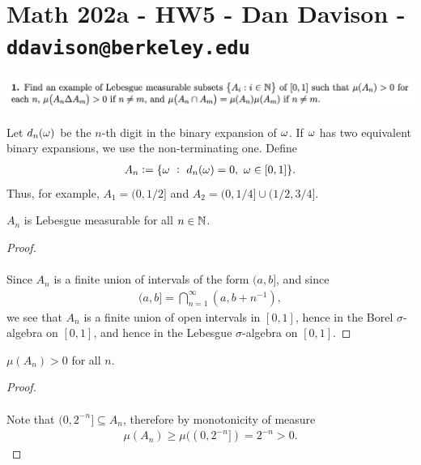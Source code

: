 \section*{Math 202a - HW5 - Dan Davison - \texttt{ddavison@berkeley.edu}}

\begin{mdframed}
\includegraphics[width=400pt]{img/analysis--berkeley-202a-hw05-781b.png}
\end{mdframed}


\begin{definition*}
  Let $d_n(\omega)$ be the $n$-th digit in the binary expansion of $\omega$. If $\omega$ has two equivalent binary
  expansions, we use the non-terminating one. Define
  \begin{align*}
    A_n := \{\omega ~:~ d_n(\omega) = 0, ~ \omega \in [0, 1]\}.
  \end{align*}
  Thus, for example, $A_1 = (0, 1/2]$ and $A_2 = (0, 1/4] \cup (1/2, 3/4]$.
\end{definition*}

\begin{claim*}
  $A_n$ is Lebesgue measurable for all $n \in \mathbb{N}$.
\end{claim*}

\begin{proof}~\\~\\
  Since $A_n$ is a finite union of intervals of the form $(a, b]$, and since
  \begin{align*}
    (a, b] = \bigcap_{n=1}^\infty (a, b + n^{-1}),
  \end{align*}
  we see that $A_n$ is a finite union of open intervals in $[0, 1]$, hence in the Borel $\sigma$-algebra
  on $[0, 1]$, and hence in the Lebesgue $\sigma$-algebra on $[0, 1]$.
\end{proof}

\begin{claim*}
  $\mu(A_n) > 0$ for all $n$.
\end{claim*}

\begin{proof}~\\~\\
  Note that $(0, 2^{-n}] \subseteq A_n$, therefore by monotonicity of measure
  \begin{align*}
    \mu(A_n) \geq \mu((0, 2^{-n}]) = 2^{-n} > 0.
  \end{align*}
\end{proof}

